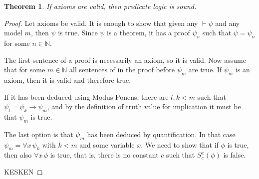 \documentclass[11pt,oneside,%
]{memoir}
\newtheorem{teoreema}{Theorem}
\theoremstyle{definition}
\newcommand{\NN}{\mathbb{N}}
\begin{document}
\begin{teoreema}
If axioms are valid, then predicate logic is sound.
\end{teoreema}
\begin{proof}
Let axioms be valid. It is enough to show that given any \(\vdash\psi\) and any model \(m\), then \(\psi\) is true. Since \(\psi\) is a theorem, it has a proof \(\psi_n\) such that \(\psi=\psi_n\) for some \(n\in\NN\).

The first sentence of a proof is necessarily an axiom, so it is valid. Now assume that for some \(m\in\NN\) all sentences of in the proof before \(\psi_m\) are true. If \(\psi_m\) is an axiom, then it is valid and therefore true.

If it has been deduced using Modus Ponens, there are \(l,k<m\) such that \(\psi_l=\psi_k\rightarrow\psi_m\), and by the definition of truth value for implication it must be that \(\psi_m\) is true.

The last option is that \(\psi_m\) has been deduced by quantification. In that case \(\psi_m=\forall x\,\psi_k\) with \(k<m\) and some variable \(x\). We need to show that if \(\phi\) is true, then also \(\forall x\,\phi\) is true, that is, there is no constant \(c\) such that \(S_c^x(\phi)\) is false.






KESKEN
\end{proof}
\end{document}
